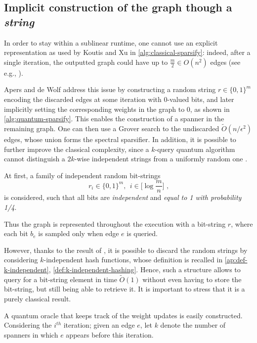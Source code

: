 \subsection{Implicit construction of the graph though a \textit{string}}

In order to stay within a sublinear runtime, one cannot use an explicit representation as
used by Koutis and Xu in \autoref{alg:classical-sparsify}: indeed, after a single iteration,
the outputted graph could have up to $\frac m2\in O(n^2)$ edges (see e.g., ).

Apers and de Wolf address this issue by
constructing a random string $r \in \{0,1\}^{m}$ encoding the discarded edges at some iteration with 0-valued bits, and later implicitly setting the corresponding weights in the graph to 0, as shown in
\autoref{alg:quantum-sparsify}.
This enables the construction of a spanner in the remaining graph.
One can then use a Grover search to the undiscarded $\tilde{O}(n/\epsilon^{2})$ edges,
whose union forms the spectral sparsifier. In addition, it is possible to further improve the classical complexity,
since  a $k$-query quantum algorithm cannot distinguish a $2k$-wise independent strings from a uniformly
random one \cite{zhandry_secure_2015}.

At first, a family of independent random bit-strings
$$r_i \in \{0,1\}^{m} \text{, } \; i \in \big[\log \frac mn\big] \text{ ,}$$
is considered, such that all bits are \emph{independent} and \emph{equal to 1 with probability 1/4}.

Thus the graph is represented throughout the execution with a bit-string $r$, where each
bit $b_e$ is sampled only when edge $e$ is queried.

However, thanks to the result of \citeauthor{zhandry_secure_2015}, it is possible to discard the random strings
by considering $k$-independent hash functions, whose definition is recalled in \autoref{ap:def-k-independent}, \autoref{def:k-independent-hashing}. Hence,
 such a structure allows to query for a bit-string element in time $\tilde{O}(1)$
without even having to store the bit-string, but still being able to retrieve it.
It is important to stress that it is a purely classical result.




A quantum oracle that keeps track of the weight updates is easily constructed.
Considering the $i^{th}$ iteration; given an edge $e$, let $k$ denote the number
of spanners in which $e$ appears before this iteration.

